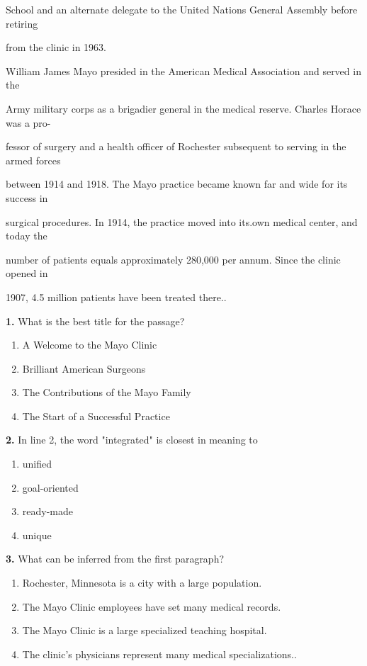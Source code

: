 \documentclass[12pt]{article}
\begin{document}
School and an alternate delegate to the United Nations General Assembly before retiring\par
from the clinic in 1963.\par
William James Mayo presided in the American Medical Association and served in the\par
Army military corps as a brigadier general in the medical reserve. Charles Horace was a pro-\par
fessor of surgery and a health officer of Rochester subsequent to serving in the armed forces\par
between 1914 and 1918. The Mayo practice became known far and wide for its success in\par
surgical procedures. In 1914, the practice moved into its.own medical center, and today the\par
number of patients equals approximately 280,000 per annum. Since the clinic opened in\par
1907, 4.5 million patients have been treated there..\par
\endgroup
\medskip
\noindent\textbf{1.} What is the best title for the passage?
\begin{enumerate}[label=(\Alph*),leftmargin=*,itemsep=0.2em]
\item A Welcome to the Mayo Clinic
\item Brilliant American Surgeons
\item The Contributions of the Mayo Family
\item The Start of a Successful Practice
\end{enumerate}
\par
\vspace{0.25\baselineskip}
\noindent\textbf{2.} In line 2, the word "integrated" is closest in meaning to
\begin{enumerate}[label=(\Alph*),leftmargin=*,itemsep=0.2em]
\item unified
\item goal-oriented
\item ready-made
\item unique
\end{enumerate}
\par
\vspace{0.25\baselineskip}
\noindent\textbf{3.} What can be inferred from the first paragraph?
\begin{enumerate}[label=(\Alph*),leftmargin=*,itemsep=0.2em]
\item Rochester, Minnesota is a city with a large population.
\item The Mayo Clinic employees have set many medical records.
\item The Mayo Clinic is a large specialized teaching hospital.
\item The clinic's physicians represent many medical specializations..
\end{enumerate}
\end{document}
